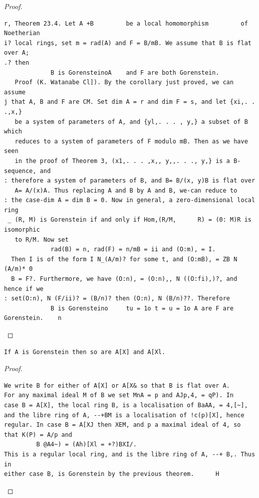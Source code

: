 \begin{proof}
\begin{verbatim}
r, Theorem 23.4. Let A +B         be a local homomorphism         of Noetherian
i? local rings, set m = rad(A) and F = B/mB. We assume that B is flat over A;
.? then
             B is GorensteinoA    and F are both Gorenstein.
   Proof (K. Watanabe Cl]). By the corollary just proved, we can assume
j that A, B and F are CM. Set dim A = r and dim F = s, and let {xi,. . .,x,}
   be a system of parameters of A, and {yl,. . . , y,} a subset of B which
   reduces to a system of parameters of F modulo mB. Then as we have seen
   in the proof of Theorem 3, (x1,. . . ,x,, y,,. . ., y,} is a B-sequence, and
: therefore a system of parameters of B, and B= B/(x, y)B is flat over
   A= A/(x)A. Thus replacing A and B by A and B, we-can reduce to
: the case-dim A = dim B = 0. Now in general, a zero-dimensional local ring
 _ (R, M) is Gorenstein if and only if Hom,(R/M,      R) = (0: M)R is isomorphic
   to R/M. Now set
             rad(B) = n, rad(F) = n/mB = ii and (O:m), = I.
  Then I is of the form I N_(A/m)? for some t, and (O:mB), = ZB N (A/m)* 0
  B = F?. Furthermore, we have (O:n), = (O:n),, N ((O:fi),)?, and hence if we
: set(O:n), N (F/ii)? = (B/n)? then (O:n), N (B/n)??. Therefore
             B is Gorensteino     tu = 1o t = u = 1o A are F are Gorenstein.    n
\end{verbatim}
\end{proof}


\begin{theorem}\label{mcrt-auto-theorem-23-5}\uses{}
\begin{verbatim}
If A is Gorenstein then so are A[X] and A[Xl.
\end{verbatim}
\end{theorem}
\begin{proof}
\begin{verbatim}
We write B for either of A[X] or A[X& so that B is flat over A.
For any maximal ideal M of B we set MnA = p and AJp,4, = qP). In
case B = A[X], the local ring B, is a localisation of BaAA, = 4,[~],
and the libre ring of A, --+BM is a localisation of !c(p)[X], hence
regular. In case B = A[XJ then XEM, and p a maximal ideal of 4, so
that K(P) = A/p and
         B @A4~) = (Ah)[Xl = +?)BXI/.
This is a regular local ring, and is the libre ring of A, --+ B,. Thus in
either case B, is Gorenstein by the previous theorem.      H
\end{verbatim}
\end{proof}


